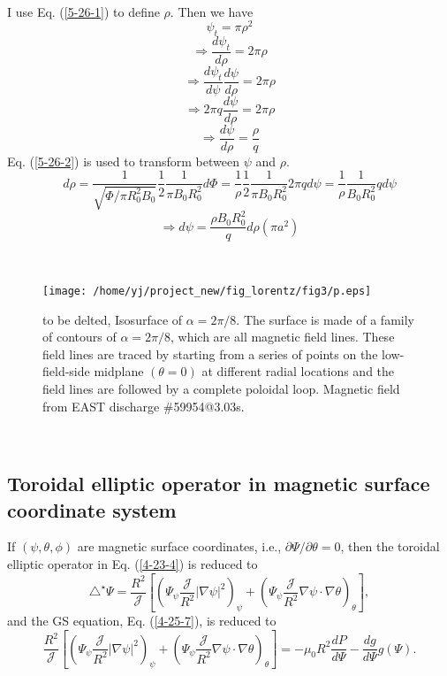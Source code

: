 \documentclass{llncs}
\begin{document}
\

I use Eq. (\ref{5-26-1}) to define $\rho$. Then we have
\begin{equation}
  \psi_t = \pi \rho^2
\end{equation}
\begin{equation}
  \Longrightarrow \frac{d \psi_t}{d \rho} = 2 \pi \rho
\end{equation}
\begin{equation}
  \Longrightarrow \frac{d \psi_t}{d \psi}  \frac{d \psi}{d \rho} = 2 \pi \rho
\end{equation}
\begin{equation}
  \Longrightarrow 2 \pi q \frac{d \psi}{d \rho} = 2 \pi \rho
\end{equation}
\begin{equation}
  \label{5-26-2} \Longrightarrow \frac{d \psi}{d \rho} = \frac{\rho}{q}
\end{equation}
Eq. (\ref{5-26-2}) is used to transform between $\psi$ and $\rho$.
\[ d \rho = \frac{1}{\sqrt{\Phi / \pi R_0^2 B_0}} \frac{1}{2} \frac{1}{\pi B_0
   R_0^2} d \Phi = \frac{1}{\rho} \frac{1}{2} \frac{1}{\pi B_0 R_0^2} 2 \pi q
   d \psi = \frac{1}{\rho} \frac{1}{B_0 R_0^2} q d \psi \]
\[ \Rightarrow d \psi = \frac{\rho B_0 R_0^2}{q} d \rho (\pi a^2) \]


\

\begin{figure}[h]
  \texttt{[image: /home/yj/project\_new/fig\_lorentz/fig3/p.eps]}
  \caption{to be delted, Isosurface of $\alpha = 2 \pi / 8$. The surface is
  made of a family of contours of $\alpha = 2 \pi / 8$, which are all magnetic
  field lines. These field lines are traced by starting from a series of
  points on the low-field-side midplane $(\theta = 0)$ at different radial
  locations and the field lines are followed by a complete poloidal loop.
  Magnetic field from EAST discharge \#59954@3.03s.}
\end{figure}

\

\subsection{Toroidal elliptic operator in magnetic surface coordinate
system}\label{4-25-9}

If $(\psi, \theta, \phi)$ are magnetic surface coordinates, i.e., $\partial
\Psi / \partial \theta = 0$, then the toroidal elliptic operator in Eq.
(\ref{4-23-4}) is reduced to
\begin{equation}
  \triangle^{\star} \Psi = \frac{R^2}{\mathcal{J}} \left[ \left( \Psi_{\psi}
  \frac{\mathcal{J}}{R^2} | \nabla \psi |^2 \right)_{\psi} + \left(
  \Psi_{\psi} \frac{\mathcal{J}}{R^2} \nabla \psi \cdot \nabla \theta
  \right)_{\theta} \right],
\end{equation}
and the GS equation, Eq. (\ref{4-25-7}), is reduced to
\begin{equation}
  \label{9-28-e1} \frac{R^2}{\mathcal{J}} \left[ \left( \Psi_{\psi}
  \frac{\mathcal{J}}{R^2} | \nabla \psi |^2 \right)_{\psi} + \left(
  \Psi_{\psi} \frac{\mathcal{J}}{R^2} \nabla \psi \cdot \nabla \theta
  \right)_{\theta} \right] = - \mu_0 R^2 \frac{d P}{d \Psi} - \frac{d g}{d
  \Psi} g (\Psi) .
\end{equation}
\end{document}
